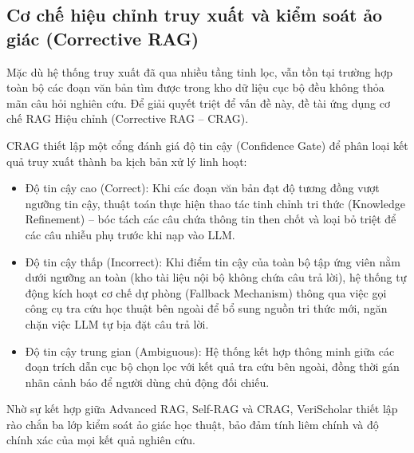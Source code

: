 \subsection{Cơ chế hiệu chỉnh truy xuất và kiểm soát ảo giác (Corrective RAG)}
\label{subsec:crag_hallucination}
Mặc dù hệ thống truy xuất đã qua nhiều tầng tinh lọc, vẫn tồn tại trường hợp toàn bộ các đoạn văn bản tìm được trong kho dữ liệu cục bộ đều không thỏa mãn câu hỏi nghiên cứu. Để giải quyết triệt để vấn đề này, đề tài ứng dụng cơ chế RAG Hiệu chỉnh (Corrective RAG -- CRAG).

CRAG thiết lập một cổng đánh giá độ tin cậy (Confidence Gate) để phân loại kết quả truy xuất thành ba kịch bản xử lý linh hoạt:
\begin{itemize}
    \item Độ tin cậy cao (Correct): Khi các đoạn văn bản đạt độ tương đồng vượt ngưỡng tin cậy, thuật toán thực hiện thao tác tinh chỉnh tri thức (Knowledge Refinement) -- bóc tách các câu chứa thông tin then chốt và loại bỏ triệt để các câu nhiễu phụ trước khi nạp vào LLM.
    \item Độ tin cậy thấp (Incorrect): Khi điểm tin cậy của toàn bộ tập ứng viên nằm dưới ngưỡng an toàn (kho tài liệu nội bộ không chứa câu trả lời), hệ thống tự động kích hoạt cơ chế dự phòng (Fallback Mechanism) thông qua việc gọi công cụ tra cứu học thuật bên ngoài để bổ sung nguồn tri thức mới, ngăn chặn việc LLM tự bịa đặt câu trả lời.
    \item Độ tin cậy trung gian (Ambiguous): Hệ thống kết hợp thông minh giữa các đoạn trích dẫn cục bộ chọn lọc với kết quả tra cứu bên ngoài, đồng thời gán nhãn cảnh báo để người dùng chủ động đối chiếu.
\end{itemize}

Nhờ sự kết hợp giữa Advanced RAG, Self-RAG và CRAG, VeriScholar thiết lập rào chắn ba lớp kiểm soát ảo giác học thuật, bảo đảm tính liêm chính và độ chính xác của mọi kết quả nghiên cứu.
